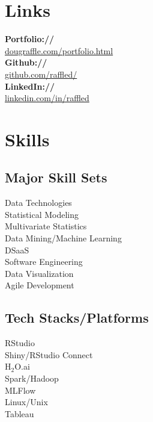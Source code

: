 \documentclass[letterpaper]{deedy-resume} %
\begin{document}
\begin{minipage}[t]{0.33\textwidth}
\section{Links} 
{\bf Portfolio://}\\ \href{http://www.dougraffle.com/portfolio.html}{dougraffle.com/portfolio.html}\\
{\bf Github://}\\ \href{http://github.com/raffled/}{github.com/raffled/}\\
{\bf LinkedIn://}\\ \href{https://www.linkedin.com/in/raffled}{linkedin.com/in/raffled} \\
\sectionspace %


\section{Skills}
\subsection{Major Skill Sets}
Data Technologies\\
Statistical Modeling\\
Multivariate Statistics\\
Data Mining/Machine Learning\\
DSaaS\\
Software Engineering\\
Data Visualization\\
Agile Development\\

\sectionspace %
\vspace{3pt}

\subsection{Tech Stacks/Platforms}
RStudio\\
Shiny/RStudio Connect\\
H$_2$O.ai\\
Spark/Hadoop\\
MLFlow\\
Linux/Unix\\
Tableau


\end{minipage}
\end{document}
